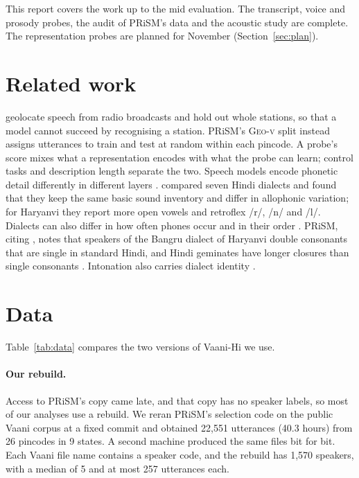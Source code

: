 \documentclass[11pt]{article}
\newcommand{\geov}{\textsc{Geo-v}}
\begin{document}
This report covers the work up to the mid evaluation. The transcript, voice and prosody probes, the audit of
PRiSM's data and the acoustic study are complete. The representation probes are planned for November
(Section~\ref{sec:plan}).

\section{Related work}
\citet{foley2024where} geolocate speech from radio broadcasts and hold out whole stations, so that a model
cannot succeed by recognising a station. PRiSM's \geov{} split instead assigns utterances to train and test at
random within each pincode. A probe's score mixes what a representation encodes with what the probe can learn;
control tasks \citep{hewitt2019control} and description length \citep{voita2020mdl} separate the two. Speech
models encode phonetic detail differently in different layers \citep{pasad2021layerwise,wells2022phonetic}.
\citet{mishra2011dialects} compared seven Hindi dialects and found that they keep the
same basic sound inventory and differ in allophonic variation; for Haryanvi they report more open vowels and
retroflex /r/, /n/ and /l/. Dialects can also differ in how often phones occur and in their order
\citep{shim2024phonotactic}. PRiSM, citing \citet{devi2021haryanvi}, notes that speakers of the Bangru dialect of
Haryanvi double consonants that are single in standard Hindi, and Hindi geminates have longer closures than single consonants
\citep{ohala2007geminates}. Intonation also carries dialect identity
\citep{grabe2002intonational,vicenik2013intonation}.

\section{Data}
\label{sec:data}
Table~\ref{tab:data} compares the two versions of Vaani-Hi we use.

\paragraph{Our rebuild.} Access to PRiSM's copy came late, and that copy has no speaker labels, so most of our
analyses use a rebuild. We reran PRiSM's selection code on the public Vaani corpus at a fixed commit and
obtained 22,551 utterances (40.3 hours) from 26 pincodes in 9 states. A second machine produced the same files
bit for bit. Each Vaani file name contains a speaker code, and the rebuild has 1,570 speakers, with a median of 5 and at
most 257 utterances each.
\end{document}
